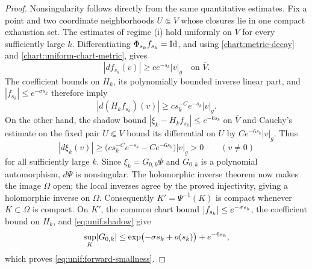 \begin{proof}
Nonsingularity follows directly from the same quantitative estimates.
Fix a point and two coordinate neighborhoods $U\Subset V$ whose
closures lie in one compact exhaustion set.  The estimates of
regime (i) hold uniformly on $\overline V$ for every sufficiently
large $k$.  Differentiating $\Phi_{s_k}f_{s_k}=\operatorname{Id}$, and using
\eqref{chart:metric-decay} and
\eqref{chart:uniform-chart-metric}, gives
\[
 |df_{s_k}(v)|\ge c e^{-s_k}|v|_g
 \quad\text{on }\overline V.
\]
The coefficient bounds on $H_k$, its polynomially bounded inverse
linear part, and $|f_{s_k}|\le e^{-\sigma s_k}$ therefore imply
\[
 |d(H_kf_{s_k})(v)|\ge c s_k^{-C}e^{-s_k}|v|_g.
\]
On the other hand, the shadow bound
$|\xi_k-H_kf_{s_k}|\le e^{-6s_k}$ on $\overline V$ and Cauchy's
estimate on the fixed pair $U\Subset V$ bound its differential on
$U$ by $C e^{-6s_k}|v|_g$.  Thus
\[
 |d\xi_k(v)|\ge
 \bigl(c s_k^{-C}e^{-s_k}-C e^{-6s_k}\bigr)|v|_g>0
 \qquad(v\ne0)
\]
for all sufficiently large $k$.  Since $\xi_k=G_{0,k}\Psi$ and
$G_{0,k}$ is a polynomial automorphism, $d\Psi$ is nonsingular.
The holomorphic inverse theorem now makes the image $\Omega$ open;
the local inverses agree by the proved injectivity, giving a
holomorphic inverse on $\Omega$.  Consequently
$K'=\Psi^{-1}(K)$ is compact whenever $K\subset\Omega$ is compact.  On $K'$, the common chart bound
$\lvert f_{s_k}\rvert\le e^{-\sigma s_k}$, the coefficient bound on $H_k$,
and \eqref{eq:unif:shadow} give
\[
 \sup_K\lvert G_{0,k}\rvert
 \le \exp\bigl(-\sigma s_k+o(s_k)\bigr)+e^{-6s_k},
\]
which proves \eqref{eq:unif:forward-smallness}.


\end{proof}
